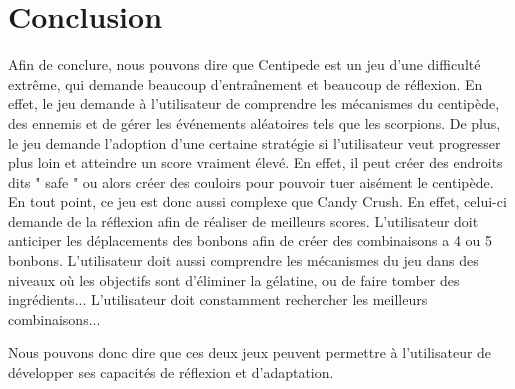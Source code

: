 \documentclass[a4paper, 12pt, oneside]{article}
\begin{document}
\section{Conclusion}
Afin de conclure, nous pouvons dire que Centipede est un jeu d'une difficulté extrême, qui demande beaucoup d'entraînement et beaucoup de réflexion. En effet, le jeu demande à l'utilisateur de comprendre les mécanismes du centipède, des ennemis et de gérer les événements aléatoires tels que les scorpions. De plus, le jeu demande l'adoption d'une certaine stratégie si l'utilisateur veut progresser plus loin et atteindre un score vraiment élevé. En effet, il peut créer des endroits dits " safe " ou alors créer des couloirs pour pouvoir tuer aisément le centipède. En tout point, ce jeu est donc aussi complexe que Candy Crush. En effet, celui-ci demande de la réflexion afin de réaliser de meilleurs scores. L'utilisateur doit anticiper les déplacements des bonbons afin de créer des combinaisons a 4 ou 5 bonbons. L'utilisateur doit aussi comprendre les mécanismes du jeu dans des niveaux où les objectifs sont d'éliminer la gélatine, ou de faire tomber des ingrédients... L'utilisateur doit constamment rechercher les meilleurs combinaisons... 

Nous pouvons donc dire que ces deux jeux peuvent permettre à l'utilisateur de développer ses capacités de réflexion et d'adaptation.
\end{document}
